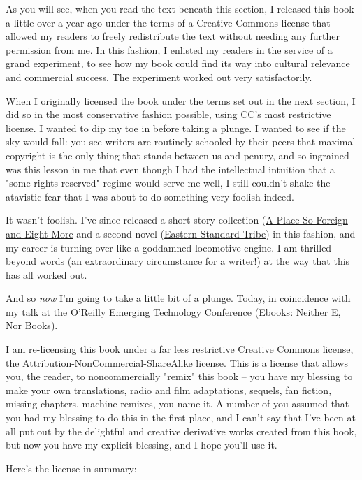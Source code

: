 As you will see, when you read the text beneath this section, I
released this book a little over a year ago under the terms of a
Creative Commons license that allowed my readers to freely
redistribute the text without needing any further permission from
me. In this fashion, I enlisted my readers in the service of a
grand experiment, to see how my book could find its way into
cultural relevance and commercial success. The experiment worked
out very satisfactorily.

When I originally licensed the book under the terms set out in the
next section, I did so in the most conservative fashion possible,
using CC's most restrictive license. I wanted to dip my toe in
before taking a plunge. I wanted to see if the sky would fall: you
see writers are routinely schooled by their peers that maximal
copyright is the only thing that stands between us and penury, and
so ingrained was this lesson in me that even though I had the
intellectual intuition that a "some rights reserved" regime would
serve me well, I still couldn't shake the atavistic fear that I was
about to do something very foolish indeed.

It wasn't foolish. I've since released a short story collection
(\href{http://craphound.com/place}{A Place So Foreign and Eight More}
and a second novel
(\href{http://craphound.com/est}{Eastern Standard Tribe}) in this
fashion, and my career is turning over like a goddamned locomotive
engine. I am thrilled beyond words (an extraordinary circumstance
for a writer!) at the way that this has all worked out.

And so \emph{now} I'm going to take a little bit of a plunge.
Today, in coincidence with my talk at the O'Reilly Emerging
Technology Conference
(\href{http://conferences.oreillynet.com/cs/et2004/view/e\_sess/4693}{Ebooks: Neither E, Nor Books}).

I am re-licensing this book under a far less restrictive Creative
Commons license, the Attribution-NonCommercial-ShareAlike license.
This is a license that allows you, the reader, to noncommercially
"remix" this book -- you have my blessing to make your own
translations, radio and film adaptations, sequels, fan fiction,
missing chapters, machine remixes, you name it. A number of you
assumed that you had my blessing to do this in the first place, and
I can't say that I've been at all put out by the delightful and
creative derivative works created from this book, but now you have
my explicit blessing, and I hope you'll use it.

Here's the license in summary:

